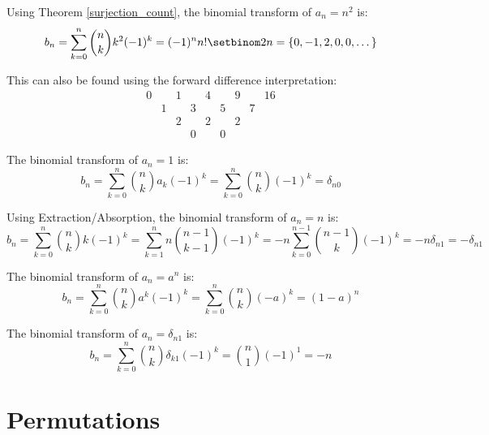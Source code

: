 \documentclass[a4paper]{article}
\begin{document}
\begin{example}
Using Theorem \ref{surjection_count}, the binomial transform of $a_n=n^2$ is:
\begin{equation*}
b_n=\sum_{k=0}^n\binom nkk^2(-1)^k=(-1)^nn!\setbinom 2n=\{0,-1,2,0,0,\dots\}
\end{equation*}

This can also be found using the forward difference interpretation:
\begin{equation*}
\begin{array}{ccccccccc}
\boxed{0}&&1&&4&&9&&16\\
&\boxed{1}&&3&&5&&7\\
&&\boxed{2}&&2&&2\\
&&&\boxed{0}&&0
\end{array}
\end{equation*}
\end{example}

\begin{example}
The binomial transform of $a_n=1$ is:
\begin{equation*}
b_n=\sum_{k=0}^n\binom nka_k(-1)^k=\sum_{k=0}^n\binom nk(-1)^k=\delta_{n0}
\end{equation*}
\end{example}

\begin{example}
Using Extraction/Absorption, the binomial transform of $a_n=n$ is:
\begin{equation*}
b_n=\sum_{k=0}^n\binom nkk(-1)^k
=\sum_{k=1}^nn\binom{n-1}{k-1}(-1)^k
=-n\sum_{k=0}^{n-1}\binom{n-1}{k}(-1)^k
=-n\delta_{n1}
=-\delta_{n1}
\end{equation*}
\end{example}

\begin{example}
The binomial transform of $a_n=a^n$ is:
\begin{equation*}
b_n=\sum_{k=0}^n\binom nka^k(-1)^k=\sum_{k=0}^n\binom nk(-a)^k=(1-a)^n
\end{equation*}
\end{example}

\begin{example}
The binomial transform of $a_n=\delta_{n1}$ is:
\begin{equation*}
b_n=\sum_{k=0}^n\binom nk\delta_{k1}(-1)^k=\binom n1(-1)^1=-n
\end{equation*}
\end{example}

\section{Permutations}
\end{document}
